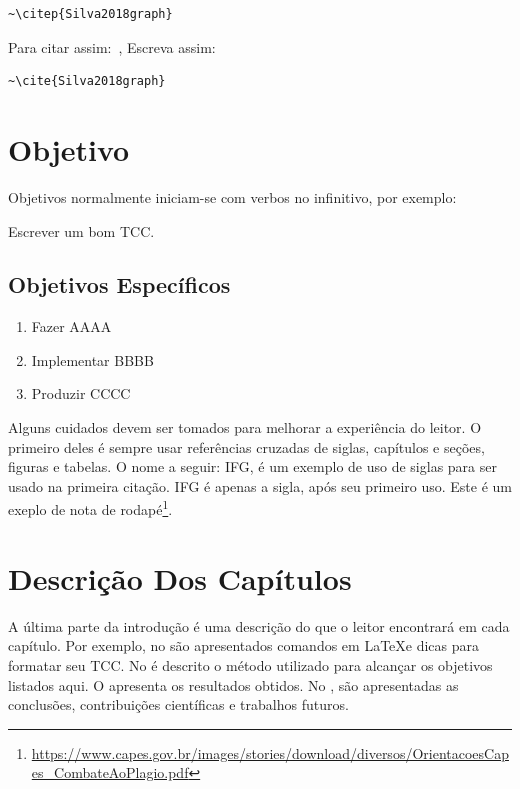 
\begin{verbatim}
~\citep{Silva2018graph}
\end{verbatim}

Para citar assim:~\cite{Silva2018graph}, Escreva assim:

\begin{verbatim}
~\cite{Silva2018graph}
\end{verbatim}


\section*{Objetivo}

Objetivos normalmente iniciam-se com verbos no infinitivo, por exemplo: 

Escrever um bom TCC.

\subsection*{Objetivos Específicos}

\begin{enumerate}
	\item Fazer AAAA
	\item Implementar BBBB
	\item Produzir CCCC
\end{enumerate}

Alguns cuidados devem ser tomados para melhorar a experiência do leitor.
O primeiro deles é sempre usar referências cruzadas de siglas, capítulos e seções, figuras e tabelas.
O nome a seguir: \acf{IFG}, é um exemplo de uso de siglas para ser usado na primeira citação.
\ac{IFG} é apenas a sigla, após seu primeiro uso.
Este é um exeplo de nota de rodapé\footnote{\url{https://www.capes.gov.br/images/stories/download/diversos/OrientacoesCapes_CombateAoPlagio.pdf}}.

\section{Descrição Dos Capítulos}

A última parte da introdução é uma descrição do que o leitor encontrará em cada capítulo.
Por exemplo, no  são apresentados comandos em \LaTeX e dicas para formatar seu TCC.
No  é descrito o método utilizado para alcançar os objetivos listados aqui.
O  apresenta os resultados obtidos.
No , são apresentadas as conclusões, contribuições científicas e trabalhos futuros.



